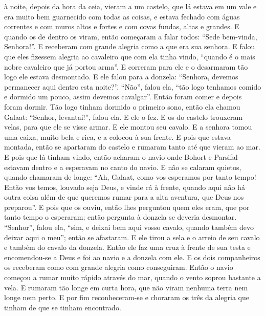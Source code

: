 à noite, depois da hora da ceia, vieram a um castelo, que lá estava em um vale e
era muito bem guarnecido com todas as coisas, e estava fechado com águas
correntes e com muros altos e fortes e com covas fundas, altas e grandes. E
quando os de dentro os viram, então começaram a falar todos: “Sede bem-vinda,
Senhora!”. E receberam com grande alegria como a que era sua senhora. E falou
que eles fizessem alegria ao cavaleiro que com ela tinha vindo, “quando é o
mais nobre cavaleiro que já portou arma”. E correram para ele e o desarmaram
tão logo ele estava desmontado. E ele falou para a donzela: “Senhora, devemos
permanecer aqui dentro esta noite?”. “Não”, falou ela, “tão logo tenhamos
comido e dormido um pouco, assim devemos cavalgar”. Então foram comer e depois
foram dormir. Tão logo tinham dormido o primeiro sono, então ela chamou Galaat:
“Senhor, levantai!”, falou ela. E ele o fez. E os do castelo trouxeram velas,
para que ele se visse armar. E ele montou seu cavalo. E a senhora tomou uma
caixa, muito bela e rica, e a colocou à sua frente. E pois que estava montada,
então se apartaram do castelo e rumaram tanto até que vieram ao mar. E pois que
lá tinham vindo, então acharam o navio onde Bohort e Parsifal estavam dentro e
a esperavam no canto do navio. E não se calaram quietos, quando chamaram de
longe: “Ah, Galaat, como vos esperamos por tanto tempo! Então vos temos,
louvado seja Deus, e vinde cá à frente, quando aqui não há outra coisa além de
que queremos rumar para a alta aventura, que Deus nos preparou”. E pois que os
ouviu, então lhes perguntou quem eles eram, que por tanto tempo o esperaram;
então pergunta à donzela se deveria desmontar. “Senhor”, falou ela, “sim, e
deixai bem aqui vosso cavalo, quando também devo deixar aqui o meu”; então se
afastaram. E ele tirou a sela e o arreio de seu cavalo e também do cavalo da
donzela. Então ele faz uma cruz à frente de sua testa e encomendou-se a Deus e
foi ao navio e a donzela com ele. E os dois companheiros os receberam como com
grande alegria como conseguiram. Então o navio começou a rumar muito rápido
através do mar, quando o vento soprou bastante a vela. E rumaram tão longe em
curta hora, que não viram nenhuma terra nem longe nem perto. E por fim
reconheceram-se e choraram os três da alegria que tinham de que se tinham
encontrado.

